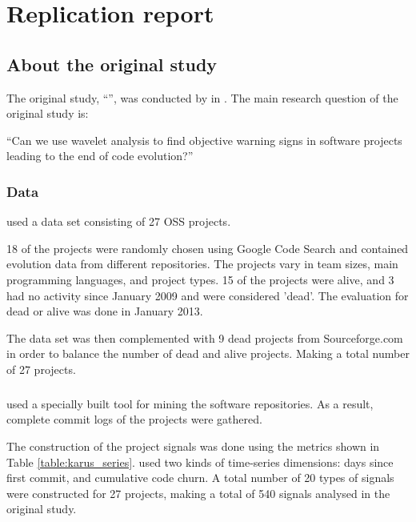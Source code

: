 \chapter{Replication report}
\label{replication}

\section{About the original study}
The original study, ``\repltitle{}'', was conducted by \replauthor{} in
\citeyear{karus2013}. The main research question of the original study is:

``Can we use wavelet analysis to find objective warning signs in software
projects leading to the end of code evolution?''

\subsection{Data}
\citeauthor{karus2013} used a data set consisting of 27 OSS projects.

18 of the projects were randomly chosen using Google Code Search and contained
evolution data from different repositories. The projects vary in team sizes,
main programming languages, and project types. 15 of the projects were alive,
and 3 had no activity since January 2009 and were considered 'dead'. The
evaluation for dead or alive was done in January 2013.

The data set was then complemented with 9 dead projects from Sourceforge.com in
order to balance the number of dead and alive projects. Making a total number of
27 projects.

\paragraph{}
\citeauthor{karus2013} used a specially built tool for mining the software
repositories. As a result, complete commit logs of the projects were gathered.

The construction of the project signals was done using the metrics shown in
Table \ref{table:karus_series}. \citeauthor{karus2013} used two kinds of
time-series dimensions: days since first commit, and cumulative code churn. A
total number of 20 types of signals were constructed for 27 projects, making a
total of 540 signals analysed in the original study.



